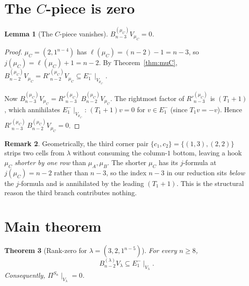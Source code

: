 \documentclass[11pt]{article}
\newtheorem{theorem}{Theorem}
\newtheorem{lemma}[theorem]{Lemma}
\theoremstyle{definition}
\newtheorem{remark}[theorem]{Remark}
\begin{document}
\section{The $C$-piece is zero}\label{sec:C-zero}

\begin{lemma}[The $C$-piece vanishes]\label{lem:C-zero}
$B_{n-3}^{(\mu_C)} V_{\mu_C}=0$.
\end{lemma}

\begin{proof}
$\mu_C=(2,1^{n-4})$ has $\ell(\mu_C)=(n-2)-1=n-3$, so
$j(\mu_C)=\ell(\mu_C)+1=n-2$.  By Theorem~\ref{thm:muC},
$B_{n-2}^{(\mu_C)} V_{\mu_C}=R'^{(\mu_C)}_{n-2} V_{\mu_C}\subseteq
E_1^-\!\mid_{V_{\mu_C}}$.

Now $B_{n-3}^{(\mu_C)} V_{\mu_C}=R'^{(\mu_C)}_{n-3}\,B_{n-2}^{(\mu_C)}
V_{\mu_C}$.  The rightmost factor of $R'^{(\mu_C)}_{n-3}$ is
$(T_1{+}1)$, which annihilates $E_1^-\!\mid_{V_{\mu_C}}$:
$(T_1{+}1)v=0$ for $v\in E_1^-$ (since $T_1 v=-v$).  Hence
$R'^{(\mu_C)}_{n-3}\,B_{n-2}^{(\mu_C)} V_{\mu_C}=0$.
\end{proof}

\begin{remark}
Geometrically, the third corner pair $\{c_1,c_2\}=\{(1,3),(2,2)\}$
strips two cells from $\lambda$ without consuming the column-$1$
bottom, leaving a hook $\mu_C$ \emph{shorter by one row} than
$\mu_A,\mu_B$.  The shorter $\mu_C$ has its $j$-formula at $j(\mu_C)=
n-2$ rather than $n-3$, so the index $n-3$ in our reduction sits
\emph{below} the $j$-formula and is annihilated by the leading
$(T_1{+}1)$.  This is the structural reason the third branch
contributes nothing.
\end{remark}

\section{Main theorem}\label{sec:main}

\begin{theorem}[Rank-zero for $\lambda=(3,2,1^{n-5})$]\label{thm:main}
For every $n\ge 8$,
\[
   B_{n-2}^{(\lambda)} V_\lambda\subseteq E_1^-\!\mid_{V_\lambda}.
\]
Consequently, $\Pi^{S_n}\!\mid_{V_\lambda}=0$.
\end{theorem}
\end{document}

